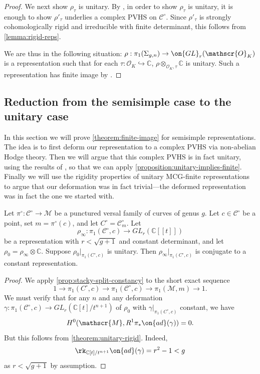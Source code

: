 \begin{proof}
We next show $\rho_\tau$ is unitary.
By \cite[Theorem 1.2.12]{LL:geometric-local-systems},
in order to show $\rho_\tau$ is unitary, it is enough to show $\rho'_\tau$ underlies
a complex PVHS on $\mathscr{C}^\circ$.
Since $\rho'_\tau$ is strongly cohomologically rigid and irreducible with finite determinant,
this follows from \autoref{lemma:rigid-reps}.

We are thus in the following situation: $\rho: \pi_1(\Sigma_{g,n})\to \on{GL}_r(\mathscr{O}_K)$ is a representation such that for each $\tau: \mathscr{O}_K\hookrightarrow \mathbb{C}$, $\rho\otimes_{\mathscr{O}_K, \tau} \mathbb{C}$ is unitary. Such a representation has finite image by \cite[Lemma 7.2.1]{LL:geometric-local-systems}.
\end{proof}

\subsection{Reduction from the semisimple case to the unitary case}
\label{subsection:semisimple-case}
In this section we will prove \autoref{theorem:finite-image} for semisimple
representations.
The idea is to first deform our representation to a complex PVHS via
non-abelian Hodge theory. Then we will argue that this complex PVHS is in fact unitary, using the results of \cite{LL:geometric-local-systems}, so that we
can apply \autoref{proposition:unitary-implies-finite}. Finally we will use the rigidity properties of unitary MCG-finite representations to argue
that our deformation was in fact trivial---the deformed representation was in fact the one we started with.

\begin{lemma}
\notready\label{lemma:infinitesmal-rigidity}
Let $\pi^\circ: \mathscr{C}^\circ\to \mathscr{M}$ be a punctured versal family
of curves of genus $g$. Let $c\in \mathscr{C}^\circ$ be a point, set
$m=\pi^\circ(c)$, and let $C^\circ=\mathscr{C}^\circ_m$. Let $$\rho_\infty: \pi_1(\mathscr{C}^\circ, c)\to GL_r(\mathbb{C}[[t]])$$ be a representation with $r<\sqrt{g+1}$ and constant determinant, and let $\rho_0=\rho_\infty\otimes\mathbb{C}$. Suppose $\rho_0|_{\pi_1(C^\circ, c)}$ is unitary. Then $\rho_\infty|_{\pi_1(C^\circ, c)}$ is conjugate to a constant representation.
\end{lemma}
\begin{proof}
	We apply \autoref{prop:stacky-split-constancy} to the short exact sequence $$1\to \pi_1(C^\circ, c)\to \pi_1(\mathscr{C}^\circ, c)\to \pi_1(\mathscr{M},m)\to 1.$$ We must verify that for any $n$ and any deformation $\gamma: \pi_1(\mathscr{C}^\circ, c)\to GL_r(\mathbb{C}[t]/t^{n+1})$ of $\rho_0$ with $\gamma|_{\pi_1(C^\circ, c)}$ constant, we have $$H^0(\mathscr{M}, R^1\pi_*\on{ad}(\gamma))=0.$$ But this follows from \autoref{theorem:unitary-rigid}. Indeed, $$\rk_{\mathbb{C}[t]/t^{n+1}} \on{ad}(\gamma)=r^2-1<g$$ as $r<\sqrt{g+1}$ by assumption.
\end{proof}


